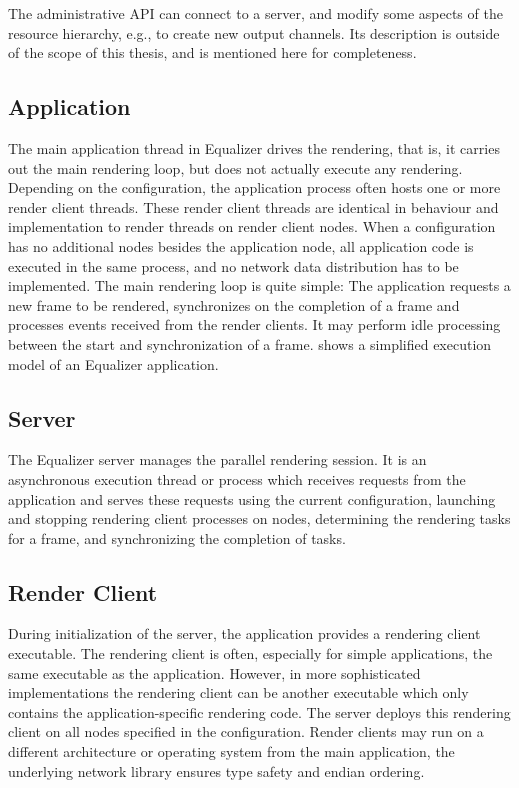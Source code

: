 The administrative API can connect to a server, and modify some aspects of the
resource hierarchy, e.g., to create new output channels. Its description is
outside of the scope of this thesis, and is mentioned here for
completeness.

\subsection{Application}

The main application thread in Equalizer drives the rendering, that is, it
carries out the main rendering loop, but does not actually execute any
rendering. Depending on the configuration, the application process often hosts
one or more render client threads. These render client threads are identical in
behaviour and implementation to render threads on render client nodes. When a
configuration has no additional nodes besides the application node, all
application code is executed in the same process, and no network data
distribution has to be implemented. The main rendering loop is quite simple:
The application requests a new frame to be rendered, synchronizes on the
completion of a frame and processes events received from the render clients. It
may perform idle processing between the start and synchronization of a frame.
 shows a simplified execution model of an Equalizer
application.


\subsection{Server}

The Equalizer server manages the parallel rendering session. It is an
asynchronous execution thread or process which receives requests from the
application and serves these requests using the current configuration, launching
and stopping rendering client processes on nodes, determining the rendering
tasks for a frame, and synchronizing the completion of tasks.

\subsection{Render Client}

During initialization of the server, the application provides a rendering
client executable. The rendering client is often, especially for simple
applications, the same executable as the application. However, in more
sophisticated implementations the rendering client can be another executable
which only contains the application-specific rendering code. The server deploys
this rendering client on all nodes specified in the configuration. Render
clients may run on a different architecture or operating system from the main
application, the underlying network library ensures type safety and endian
ordering.

